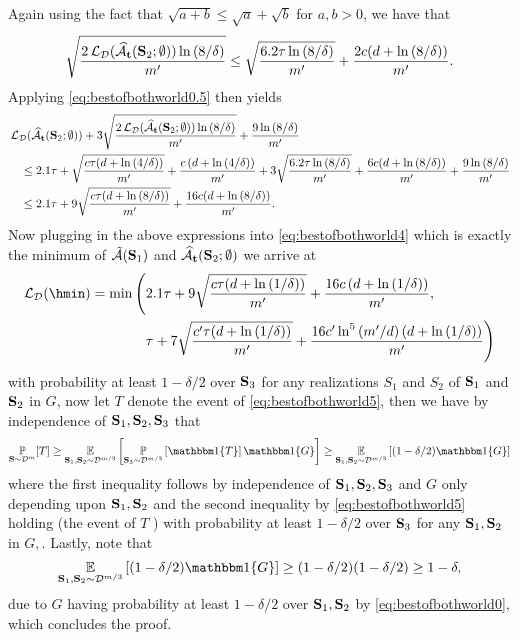 Again using the fact that $\sqrt{a+b}\leq \sqrt{a}+\sqrt{b} $ for $ a,b>0$, we have that 
\begin{align*}
    \sqrt{\frac{2\operatorname{\mathcal{L}}_{\mathcal{D}}(\widehat{\mathcal{A}}_{\mathbf{t}}(\mathbf{S}_{2};\emptyset))\ln{(8/\delta )}}{m'}}
    \leq\sqrt{\frac{6.2 \tau\ln{\left(8/\delta \right)}}{m'}}+\frac{2c(d+\ln{\left(8/\delta \right)})}{m'}. 
\end{align*}
Applying \cref{eq:bestofbothworld0.5} then yields
\begin{align*}
& \operatorname{\mathcal{L}}_{\mathcal{D}}(\widehat{\mathcal{A}}_{\mathbf{t}}(\mathbf{S}_{2};\emptyset)) + 3\sqrt{\frac{2\operatorname{\mathcal{L}}_{\mathcal{D}}(\widehat{\mathcal{A}}_{\mathbf{t}}(\mathbf{S}_{2};\emptyset))\ln{(8/\delta )}}{m'}}+\frac{9\ln{(8/\delta )}}{m'} \\
& \quad \leq 2.1 \tau+\sqrt{\frac{c\tau(d+\ln{\left(4/\delta \right)})}{m'}}+\frac{c\left(d+\ln{\left(4/\delta \right)}\right)}{m'}+ 3 \sqrt{\frac{6.2 \tau\ln{\left(8/\delta \right)}}{m'}}+\frac{6c(d+\ln{\left(8/\delta \right)})}{m'}+\frac{9\ln{\left(8/\delta \right)}}{m'} \\
& \quad \leq 2.1 \tau+ 9\sqrt{\frac{c\tau(d+\ln{\left(8/\delta \right)})}{m'}}+\frac{16 c(d+\ln{\left(8/\delta \right)})}{m'}.
\end{align*}
Now plugging in the above expressions into \cref{eq:bestofbothworld4} which is exactly the minimum of   $ \tilde{\mathcal{A}}(\mathbf{S}_{1}) $ and $ \widehat{\mathcal{A}}_{\mathbf{t}}(\mathbf{S}_{2};\emptyset) $ we arrive at 
\begin{align}\label{eq:bestofbothworld5}
\ls_{\cD}(\hmin)= \min\Bigg(&2.1 \tau + 9 \sqrt{\frac{c\tau(d+\ln{\left(1/\delta \right)})}{m'}}+\frac{16 c\left(d+\ln{\left(1/\delta \right)}\right)}{m'}, \nonumber \\
& \tau + 7 \sqrt{\frac{c'\tau(d+\ln{\left(1/\delta \right)})}{m'}}+\frac{16 c'\ln^{5}{\left( m'/d\right)}\left(d+\ln{\left(1/\delta \right)}      \right)}{m'} \Bigg)
\end{align}
with probability at least $ 1-\delta/2 $ over $ \mathbf{S}_{3} $ for any realizations  $ S_{1} $ and $ S_{2} $ of $ \mathbf{S}_{1} $ and $ \mathbf{S}_{2} $   in $ G $, now let $ T $ denote the event of \cref{eq:bestofbothworld5}, then we have by independence of $ \mathbf{S}_{1},\mathbf{S}_{2},\mathbf{S}_{3} $ that 
\begin{align*}
 \p_{\rS\sim \cD^{m}}[T]
 \geq
 \e_{\rS_{1},\rS_{2}\sim \cD^{m/3}}\left[\p_{\rS_{3}\sim \cD^{m/3}}\left[\ind\{ T \} \right]\ind\{  G\} \right]
 \geq 
 \e_{\rS_{1},\rS_{2}\sim \cD^{m/3}}\left[(1-\delta/2)\ind\{  G\} \right]
\end{align*}
where the first inequality follows by independence of $ \mathbf{S}_{1},\mathbf{S}_{2},\mathbf{S}_{3} $ and $ G $ only depending upon $ \mathbf{S}_{1},\mathbf{S}_{2}$ and the second inequality by \cref{eq:bestofbothworld5} holding (the event of $ T $ ) with probability at least $ 1-\delta/2$ over $ \mathbf{S}_{3}$ for any $ \mathbf{S}_{1},\mathbf{S}_{2} $ in $ G,$. Lastly, note that 
\[  \e_{\rS_{1},\rS_{2}\sim \cD^{m/3}} \left[(1-\delta/2)\ind\{  G\} \right] \geq (1-\delta/2)(1-\delta/2)\geq1-\delta, \]
due to $G$ having probability at least $ 1-\delta/2$ over $ \mathbf{S}_{1},\mathbf{S}_{2} $ by \cref{eq:bestofbothworld0}, which concludes the proof.    

